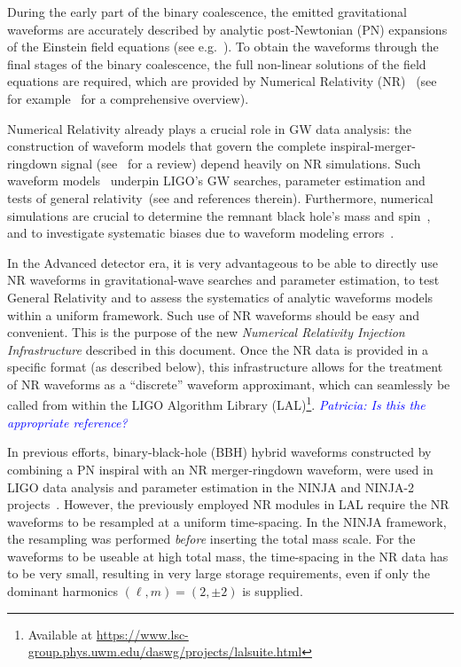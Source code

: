 \documentclass[11pt,tightenlines,article,amssymb,amsmath,amsfonts,superscriptaddress,nofootinbib]{revtex4}
\newcommand{\patricia}[1]{\textcolor{blue}{\textit{Patricia: #1}}}
\begin{document}
During the early part of the binary coalescence, the emitted gravitational waveforms are accurately described by
analytic post-Newtonian (PN) expansions of the Einstein field equations (see e.g.~\cite{lrr-2014-2}). 
To obtain the waveforms through the final stages of the binary coalescence, the full non-linear solutions
of the field equations are required, which are provided by Numerical Relativity (NR)~\cite{Pretorius:2005gq, Baker:2005vv, Campanelli:2005dd} (see for example~\cite{Centrella:2010mx} for a comprehensive overview).

Numerical Relativity already plays a crucial role in GW data analysis: the construction of waveform models that govern the complete inspiral-merger-ringdown signal (see~\cite{Ohme:2011rm} for a review) depend heavily on NR simulations. Such waveform models~\cite{Hannam:2013oca, Pan:2013rra, Taracchini:2013rva, Khan:2015jqa} underpin LIGO's GW searches, parameter estimation and tests of general relativity~(see \cite{Abbott:2016blz} and references therein). Furthermore, numerical simulations are crucial to determine the remnant black hole's mass and spin~\cite{Healy:2014yta}, and to investigate systematic biases due to waveform modeling errors~\cite{Abbott:2016wiq}.

In the Advanced detector era, it is very advantageous to be able to directly use NR waveforms in gravitational-wave searches and parameter estimation, to test General Relativity and to assess the systematics of analytic waveforms models within a uniform framework. Such use of NR waveforms should be easy and convenient.
This is the purpose of the new \emph{Numerical Relativity Injection Infrastructure} described in this document. Once the NR data is provided in a specific format (as described below), this infrastructure allows for the treatment of
NR waveforms as a ``discrete'' waveform approximant, which can seamlessly be called from within the LIGO Algorithm Library (LAL)\footnote{Available at \url{https://www.lsc-group.phys.uwm.edu/daswg/projects/lalsuite.html}}.
\patricia{Is this the appropriate reference?}

In previous efforts, binary-black-hole (BBH) hybrid waveforms constructed by combining a PN inspiral with an NR merger-ringdown waveform, were used in LIGO data analysis and parameter estimation in the NINJA and NINJA-2 projects~\cite{Aylott:2009ya, Aasi:2014tra}.  
However, the previously employed NR modules in LAL
require the NR waveforms to be resampled at a uniform time-spacing. In the NINJA framework, the resampling was performed \emph{before} inserting the total mass scale. For the waveforms to be
useable at high total mass, the time-spacing in the NR data has to be very small, resulting in very large storage requirements, even if only the dominant harmonics $(\ell,m)=(2,\pm 2)$ is supplied.
\end{document}
